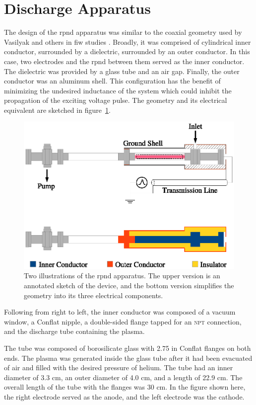 

\section{Discharge Apparatus}

The design of the \acs{rpnd} apparatus was similar to the coaxial geometry used
by Vasilyak and others in \acs{fiw} studies \cite{Vasilyak1994}. Broadly, it was
comprised of cylindrical inner conductor, surrounded by a dielectric, surrounded
by an outer conductor. In this case, two electrodes and the \acs{rpnd} between
them served as the inner conductor. The dielectric was provided by a glass tube
and an air gap. Finally, the outer conductor was an aluminum shell. This
configuration has the benefit of minimizing the undesired inductance of the
system which could inhibit the propagation of the exciting voltage pulse.
The geometry and its electrical equivalent are sketched in
figure~\ref{fig:appschem}.
\begin{figure}
  \centering
  \includegraphics{./chapters/experiment/figures/appschem.eps}
  \caption{Two illustrations of the \acs{rpnd} apparatus. The upper version is
    an annotated sketch of the device, and the bottom version simplifies the
    geometry into its three electrical components.}
  \label{fig:appschem}
\end{figure}
Following from right to left, the inner conductor was composed of a vacuum
window, a Conflat nipple, a double-sided flange tapped for an \textsc{npt}
connection, and the discharge tube containing the plasma.

The tube was composed of borosilicate glass with 2.75 in Conflat flanges on both
ends. The plasma was generated inside the glass tube after it had been evacuated
of air and filled with the desired pressure of helium. The tube had an inner
diameter of 3.3 cm, an outer diameter of 4.0 cm, and a length of 22.9 cm. The
overall length of the tube with the flanges was 30 cm. In the figure shown here,
the right electrode served as the anode, and the left electrode was the cathode.

